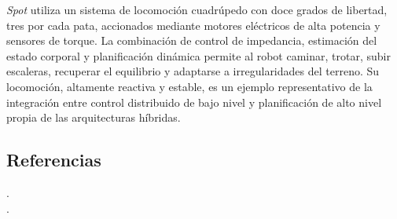 \textit{Spot} utiliza un sistema de locomoción cuadrúpedo con doce grados de libertad, tres por cada pata, accionados mediante motores eléctricos de alta potencia y sensores de torque. La combinación de control de impedancia, estimación del estado corporal y planificación dinámica permite al robot caminar, trotar, subir escaleras, recuperar el equilibrio y adaptarse a irregularidades del terreno. Su locomoción, altamente reactiva y estable, es un ejemplo representativo de la integración entre control distribuido de bajo nivel y planificación de alto nivel propia de las arquitecturas híbridas. \\

\subsection*{Referencias}
\cite{SpotBD} .\\
\cite{SpotICRA} .